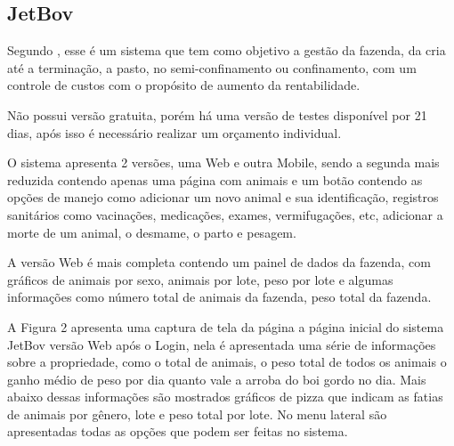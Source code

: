 




\subsection{\textbf{JetBov}}

Segundo , esse é um sistema que tem como objetivo a gestão da fazenda, da cria até a terminação, a pasto, no semi-confinamento ou confinamento, com um controle de custos com o propósito de aumento da rentabilidade.

Não possui versão gratuita, porém há uma versão de testes disponível por 21 dias, após isso é necessário realizar um orçamento individual.

O sistema apresenta 2 versões, uma Web e outra Mobile, sendo a segunda mais reduzida contendo apenas uma página com animais e um botão contendo as opções de manejo como adicionar um novo animal e sua identificação, registros sanitários como vacinações, medicações, exames, vermifugações, etc, adicionar a morte de um animal, o desmame, o parto e pesagem.

A versão Web é mais completa contendo um painel de dados da fazenda, com gráficos de animais por sexo, animais por lote, peso por lote e algumas informações como número total de animais da fazenda, peso total da fazenda.

A Figura 2 apresenta uma captura de tela da página a página inicial do sistema JetBov versão Web após o Login, nela é apresentada uma série de informações sobre a propriedade, como o total de animais, o peso total de todos os animais o ganho médio de peso por dia quanto vale a arroba do boi gordo no dia. Mais abaixo dessas informações são mostrados gráficos de pizza que indicam as fatias de animais por gênero, lote e peso total por lote. No menu lateral são apresentadas todas as opções que podem ser feitas no sistema.

